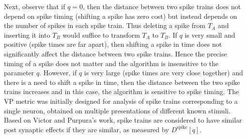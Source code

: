 Next, observe that if $q=0$, then the distance between two spike trains does not depend on spike timing (shifting a spike has zero cost) but instead depends on the number of spikes in each spike train. Thus deleting a spike from $T_{A}$ and inserting it into $T_{B}$ would suffice to transform $T_{A}$ to $T_{B}$.
If $q$ is very small and positive (spike times are far apart), then shifting a spike in time does not significantly affect the distance between two spike trains. Hence the precise timing of a spike does not matter and the algorithm is insensitive to the parameter $q$.
However, if $q$ is very large (spike times are very close together) and there is  a need to shift a spike in time, then the distance between the two spike trains 
increases and in this case, the algorithm is sensitive to spike timing.
The VP metric was initially designed for analysis of spike trains corresponding to a single neuron, obtained on multiple presentations of different known stimuli. Based on Victor and Purpura's work, spike trains are considered to have similar post synaptic effects if they are similar, as measured by $D^{\text{spike}}[q]$.



